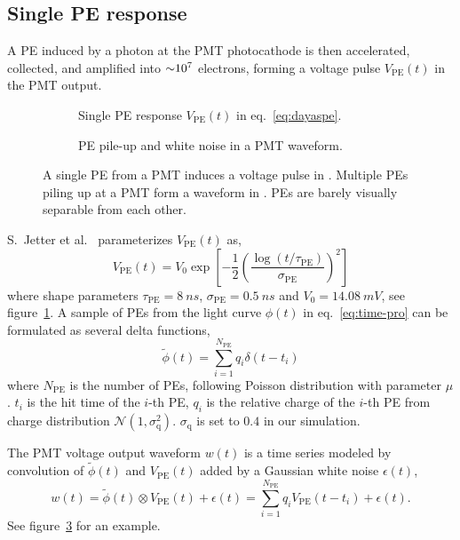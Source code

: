 \subsection{Single PE response}
\label{subsec:spe}

A PE induced by a photon at the PMT photocathode is then accelerated, collected, and amplified into $\num[retain-unity-mantissa=false]{\sim 1e7}$ electrons, forming a voltage pulse $V_\mathrm{PE}(t)$ in the PMT output.
\begin{figure}[H]
  \begin{subfigure}{.49\textwidth}
    \centering
    \resizebox{\textwidth}{!}{}
    \caption{\label{fig:spe} Single PE response $V_\mathrm{PE}(t)$ in eq.~\eqref{eq:dayaspe}.}
  \end{subfigure}
  \begin{subfigure}{.49\textwidth}
    \centering
    \resizebox{\textwidth}{!}{}
    \caption{\label{fig:pile} PE pile-up and white noise in a PMT waveform.}
  \end{subfigure}
  \caption{A single PE from a PMT induces a voltage pulse in .  Multiple PEs piling up at a PMT form a waveform in .  PEs are barely visually separable from each other.}
\end{figure}

S.~Jetter et al.~\cite{jetter_pmt_2012} parameterizes $V_\mathrm{PE}(t)$ as,
\begin{equation}
  V_\mathrm{PE}(t) = V_{0}\exp\left[-\frac{1}{2}\left(\frac{\log(t/\tau_\mathrm{PE})}{\sigma_\mathrm{PE}}\right)^{2}\right]
  \label{eq:dayaspe}
\end{equation}
where shape parameters $\tau_\mathrm{PE}=\SI{8}{ns}$, $\sigma_\mathrm{PE}=\SI{0.5}{ns}$ and $V_{0}=\SI{14.08}{mV}$, see figure~\ref{fig:spe}.  A sample of PEs from the light curve $\phi(t)$ in eq.~\eqref{eq:time-pro} can be formulated as several delta functions, 
\begin{equation}
  \label{eq:lc-sample}
  \tilde{\phi}(t) = \sum_{i=1}^{N_{\mathrm{PE}}} q_i \delta(t-t_i)
\end{equation}
where $N_\mathrm{PE}$ is the number of PEs, following Poisson distribution with parameter $\mu$.  $t_i$ is the hit time of the $i$-th PE, $q_i$ is the relative charge of the $i$-th PE from charge distribution $\mathcal{N}(1,\sigma_\mathrm{q}^2)$.  $\sigma_\mathrm{q}$ is set to $0.4$ in our simulation.

The PMT voltage output waveform $w(t)$ is a time series modeled by convolution of $\tilde{\phi}(t)$ and $V_\mathrm{PE}(t)$ added by a Gaussian white noise $\epsilon(t)$,
\begin{equation}
  \label{eq:1}
  w(t) = \tilde{\phi}(t) \otimes V_\mathrm{PE}(t) + \epsilon(t) = \sum_{i=1}^{N_\mathrm{PE}} q_i V_\mathrm{PE}(t-t_i) + \epsilon(t).
\end{equation}
See figure~\ref{fig:pile} for an example.


